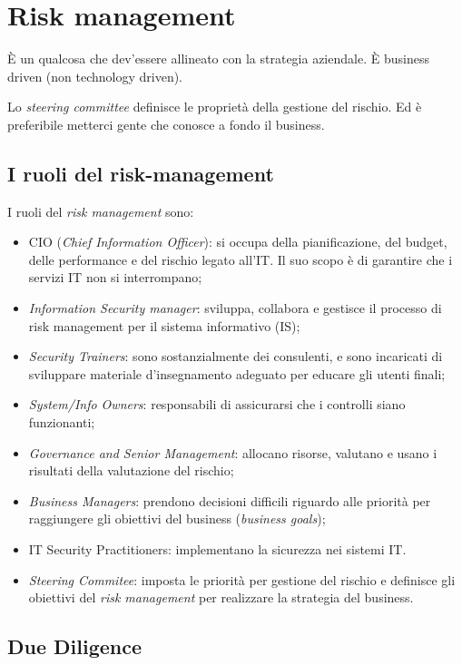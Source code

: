 \section{Risk management}

È un qualcosa che dev'essere allineato con la strategia aziendale.
È business driven (non technology driven).

Lo \textit{steering committee} definisce le proprietà della gestione del
rischio. Ed è preferibile metterci gente che conosce a fondo il business.

\subsection{I ruoli del risk-management}

I ruoli del \textit{risk management} sono:
\begin{itemize}
\item CIO (\textit{Chief Information Officer}): si occupa della pianificazione,
del budget, delle performance e del rischio legato all'IT. Il suo scopo
è di garantire che i servizi IT non si interrompano;
\item \textit{Information Security manager}: sviluppa, collabora e gestisce
il processo di risk management per il sistema informativo (IS);
\item \textit{Security Trainers}: sono sostanzialmente dei consulenti, e sono incaricati
di sviluppare materiale d'insegnamento adeguato per educare gli utenti finali;
\item \textit{System/Info Owners}: responsabili di assicurarsi che i controlli siano
funzionanti;
\item \textit{Governance and Senior Management}: allocano risorse, valutano e usano i
risultati della valutazione del rischio;
\item \textit{Business Managers}: prendono decisioni difficili riguardo alle priorità
per raggiungere gli obiettivi del business (\textit{business goals});
\item IT Security Practitioners: implementano la sicurezza nei sistemi IT.
\item \textit{Steering Commitee}: imposta le priorità per gestione del
rischio e definisce gli obiettivi del \textit{risk management} per realizzare la
strategia del business.
\end{itemize}

\subsection{Due Diligence}

